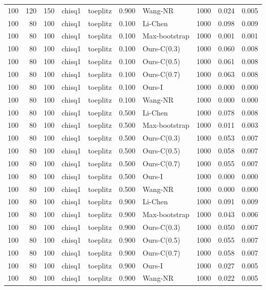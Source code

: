 \begin{tabular}{rrrllrlrrr}
100 & 120 & 150 & chisq1 & toeplitz & 0.900 & Wang-NR & 1000 & 0.024 & 0.005 \\
100 & 80 & 100 & chisq1 & toeplitz & 0.100 & Li-Chen & 1000 & 0.098 & 0.009 \\
100 & 80 & 100 & chisq1 & toeplitz & 0.100 & Max-bootstrap & 1000 & 0.001 & 0.001 \\
100 & 80 & 100 & chisq1 & toeplitz & 0.100 & Ours-C(0.3) & 1000 & 0.060 & 0.008 \\
100 & 80 & 100 & chisq1 & toeplitz & 0.100 & Ours-C(0.5) & 1000 & 0.061 & 0.008 \\
100 & 80 & 100 & chisq1 & toeplitz & 0.100 & Ours-C(0.7) & 1000 & 0.063 & 0.008 \\
100 & 80 & 100 & chisq1 & toeplitz & 0.100 & Ours-I & 1000 & 0.000 & 0.000 \\
100 & 80 & 100 & chisq1 & toeplitz & 0.100 & Wang-NR & 1000 & 0.000 & 0.000 \\
100 & 80 & 100 & chisq1 & toeplitz & 0.500 & Li-Chen & 1000 & 0.078 & 0.008 \\
100 & 80 & 100 & chisq1 & toeplitz & 0.500 & Max-bootstrap & 1000 & 0.011 & 0.003 \\
100 & 80 & 100 & chisq1 & toeplitz & 0.500 & Ours-C(0.3) & 1000 & 0.053 & 0.007 \\
100 & 80 & 100 & chisq1 & toeplitz & 0.500 & Ours-C(0.5) & 1000 & 0.058 & 0.007 \\
100 & 80 & 100 & chisq1 & toeplitz & 0.500 & Ours-C(0.7) & 1000 & 0.055 & 0.007 \\
100 & 80 & 100 & chisq1 & toeplitz & 0.500 & Ours-I & 1000 & 0.000 & 0.000 \\
100 & 80 & 100 & chisq1 & toeplitz & 0.500 & Wang-NR & 1000 & 0.000 & 0.000 \\
100 & 80 & 100 & chisq1 & toeplitz & 0.900 & Li-Chen & 1000 & 0.091 & 0.009 \\
100 & 80 & 100 & chisq1 & toeplitz & 0.900 & Max-bootstrap & 1000 & 0.043 & 0.006 \\
100 & 80 & 100 & chisq1 & toeplitz & 0.900 & Ours-C(0.3) & 1000 & 0.050 & 0.007 \\
100 & 80 & 100 & chisq1 & toeplitz & 0.900 & Ours-C(0.5) & 1000 & 0.055 & 0.007 \\
100 & 80 & 100 & chisq1 & toeplitz & 0.900 & Ours-C(0.7) & 1000 & 0.058 & 0.007 \\
100 & 80 & 100 & chisq1 & toeplitz & 0.900 & Ours-I & 1000 & 0.027 & 0.005 \\
100 & 80 & 100 & chisq1 & toeplitz & 0.900 & Wang-NR & 1000 & 0.022 & 0.005 \\

\end{tabular}
